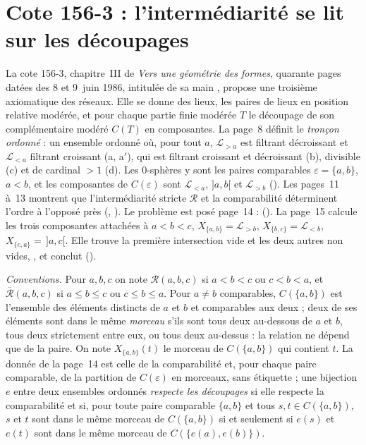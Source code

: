 \section[Cote 156-3 : l'intermédiarité se lit sur les découpages]{Cote 156-3 : l'intermédiarité se lit sur les découpages\protect{}}\label{sec:156-3}

La cote 156-3, chapitre~III de \emph{Vers une géométrie des formes}, quarante pages datées des 8 et 9~juin 1986, intitulée de sa main , propose une troisième axiomatique des réseaux. Elle se donne des lieux, les paires de lieux en position relative modérée, et pour chaque partie finie modérée $T$ le découpage de son complémentaire modéré $C(T)$ en composantes. La page~8 définit le \emph{tronçon ordonné} : un ensemble ordonné où, pour tout $a$, $\mathcal L_{>a}$ est filtrant décroissant et $\mathcal L_{<a}$ filtrant croissant (a, a$'$), qui est filtrant croissant et décroissant (b), divisible (c) et de cardinal $> 1$ (d). Les 0-sphères y sont les paires comparables $\varepsilon = \{a,b\}$, $a < b$, et les composantes de $C(\varepsilon)$ sont $\mathcal L_{<a}$, $]a,b[$ et $\mathcal L_{>b}$ (). Les pages~11 à~13 montrent que l'intermédiarité stricte $\mathcal R$ et la comparabilité déterminent l'ordre à l'opposé près (, ). Le problème est posé page~14 :  (). La page~15 calcule les trois composantes attachées à $a<b<c$, $X_{\{a,b\}} = \mathcal L_{>b}$, $X_{\{b,c\}} = \mathcal L_{<b}$, $X_{\{c,a\}} = \,]a,c[$. Elle trouve la première intersection vide et les deux autres non vides, , et conclut  ().

\noindent\emph{Conventions.} Pour $a, b, c$ on note $\mathcal R(a,b,c)$ si $a < b < c$ ou $c < b < a$, et $\overline{\mathcal R}(a,b,c)$ si $a \leq b \leq c$ ou $c \leq b \leq a$. Pour $a \neq b$ comparables, $C(\{a,b\})$ est l'ensemble des éléments distincts de $a$ et $b$ et comparables aux deux ; deux de ses éléments sont dans le même \emph{morceau} s'ils sont tous deux au-dessous de $a$ et $b$, tous deux strictement entre eux, ou tous deux au-dessus : la relation ne dépend que de la paire. On note $X_{\{a,b\}}(t)$ le morceau de $C(\{a,b\})$ qui contient $t$. La donnée de la page~14 est celle de la comparabilité et, pour chaque paire comparable, de la partition de $C(\varepsilon)$ en morceaux, sans étiquette ; une bijection $e$ entre deux ensembles ordonnés \emph{respecte les découpages} si elle respecte la comparabilité et si, pour toute paire comparable $\{a,b\}$ et tous $s, t \in C(\{a,b\})$, $s$ et $t$ sont dans le même morceau de $C(\{a,b\})$ si et seulement si $e(s)$ et $e(t)$ sont dans le même morceau de $C(\{e(a), e(b)\})$.

